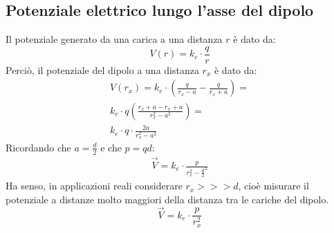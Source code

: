 \subsection{Potenziale elettrico lungo l'asse del dipolo}
Il potenziale generato da una carica a una distanza $r$ è dato da:
\begin{displaymath}
	V(r) = k_e \cdot \frac{q}{r}
\end{displaymath}
Perciò, il potenziale del dipolo a una distanza $r_x$ è dato da:
\begin{displaymath}\begin{aligned}
	V(r_x) = k_e \cdot \left( \frac{q}{r_x-a} - \frac{q}{r_x+a} \right) =\\ 
    k_e \cdot q \left( \frac{r_x + a - r_x + a}{r_x^2 -a^2} \right)=\\
    k_e \cdot q \cdot \frac{2a}{r_x^2-a^2}
\end{aligned}\end{displaymath}
Ricordando che $a = \frac{d}{2}$ e che $p = qd$:
\begin{displaymath}\begin{aligned}
	\vec{V} = k_e \cdot \frac{p}{r_x^2 - \frac{d}{2}^2}    
\end{aligned}\end{displaymath}
Ha senso, in applicazioni reali considerare $r_x >>> d$, cioè misurare il potenziale a distanze molto maggiori della distanza tra le cariche del dipolo.
\begin{displaymath}
	\vec{V} = k_e \cdot \frac{p}{r_x^2}
\end{displaymath}
